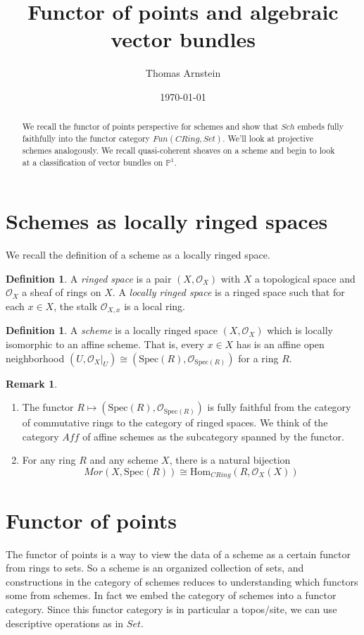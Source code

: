 \documentclass[letterpaper,10pt,twoside]{amsart}
\title{Functor of points and algebraic vector bundles}
\author[]{Thomas Arnstein}
\date{\today}
\theoremstyle{proposition}
\theoremstyle{definition}
\newtheorem{definition}[proposition]{Definition}
\theoremstyle{theorem}
\theoremstyle{definition}
\newtheorem{remark}[proposition]{\textbf{Remark}}
\theoremstyle{definition}
\theoremstyle{definition}
\theoremstyle{lemma}
\theoremstyle{definition}
\theoremstyle{definition}
\theoremstyle{corollary}
\theoremstyle{definition}
\def\Hom{\text{Hom}}
\def\Spec{\text{Spec}}
\def\O{\mathcal{O}}
\begin{document}
	\maketitle
    \begin{abstract}
        We recall the functor of points perspective for schemes and show that $Sch$ embeds fully faithfully into the functor category $Fun(CRing,Set)$. We'll look at projective schemes analogously. We recall quasi-coherent sheaves on a scheme and begin to look at a classification of vector bundles on $\mathbb{P}^1$.
    \end{abstract}
	\tableofcontents

\section{Schemes as locally ringed spaces}

We recall the definition of a scheme as a locally ringed space.

\begin{definition}
    A \textit{ringed space} is a pair $(X,\O_X)$ with $X$ a topological space and $\O_X$ a sheaf of rings on $X$. A \textit{locally ringed space} is a ringed space such that for each $x\in X$, the stalk $\O_{X,x}$ is a local ring.
\end{definition}

\begin{definition}
    A \textit{scheme} is a locally ringed space $(X,\O_X)$ which is locally isomorphic to an affine scheme. That is, every $x\in X$ has is an affine open neighborhood $(U,\O_X|_U) \cong (\Spec(R),\O_{\Spec(R)})$ for a ring $R$.
\end{definition}

\begin{remark}
    \begin{enumerate}
        \item The functor $R\mapsto (\Spec(R),\O_{\Spec(R)})$ is fully faithful from the category of commutative rings to the category of ringed spaces. We think of the category $Aff$ of affine schemes as the subcategory spanned by the functor. 
        \item \cite{EH} For any ring $R$ and any scheme $X$, there is a natural bijection \[Mor(X,\Spec(R))\cong\Hom_{CRing}(R,\O_X(X))\]

    \end{enumerate}
\end{remark}

\section{Functor of points}
The functor of points is a way to view the data of a scheme as a certain functor from rings to sets. So a scheme is an organized collection of sets, and constructions in the category of schemes reduces to understanding which functors some from schemes. In fact we embed the category of schemes into a functor category. Since this functor category is in particular a topos/site, we can use descriptive operations as in $Set$. 
\end{document}
